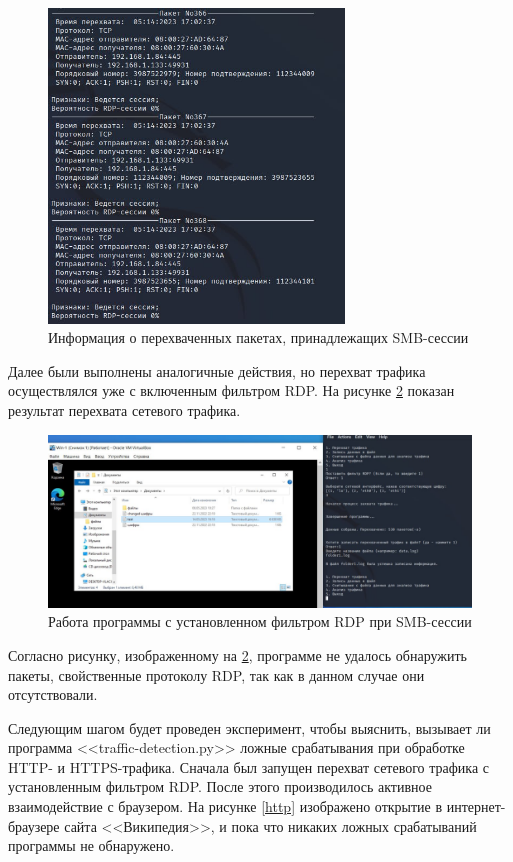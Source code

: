 \documentclass[bachelor, och, coursework]{SCWorks}
\begin{document}
\begin{figure}[H]
  \centering
  \includegraphics[width=0.7\textwidth]{photo/smb2.jpg}
  \caption{Информация о перехваченных пакетах, принадлежащих SMB-сессии}
  \label{smb2}
\end{figure}

Далее были выполнены аналогичные действия, но перехват трафика осуществлялся уже с включенным фильтром RDP.
На рисунке \ref{smbfilter} показан результат перехвата сетевого трафика.

\begin{figure}[H]
  \centering
  \includegraphics[width=1\textwidth]{photo/smb-filter.jpg}
  \caption{Работа программы с установленном фильтром RDP при SMB-сессии}
  \label{smbfilter}
\end{figure}

Согласно рисунку, изображенному на \ref{smbfilter}, программе не удалось обнаружить пакеты, свойственные протоколу RDP, 
так как в данном случае они отсутствовали.   

Следующим шагом будет проведен эксперимент, чтобы выяснить, вызывает ли программа <<traffic-detection.py>> ложные срабатывания 
при обработке HTTP- и HTTPS-трафика. Сначала был запущен перехват сетевого трафика с установленным фильтром RDP. После этого
производилось активное взаимодействие с браузером. На рисунке \ref{http} изображено открытие в интернет-браузере сайта <<Википедия>>, и
пока что никаких ложных срабатываний программы не обнаружено.
\end{document}
